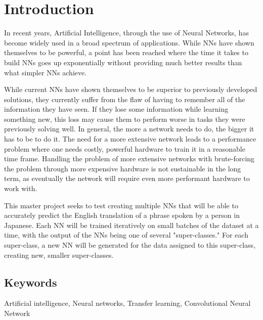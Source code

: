 \chapter{Introduction}






In recent years, Artificial Intelligence, through the use of Neural Networks, has become widely used in a broad spectrum of applications. 
While NNs have shown themselves to be powerful, a point has been reached where the time it takes to build NNs goes up exponentially without providing much better results than what simpler NNs achieve.

While current NNs have shown themselves to be superior to previously developed solutions, they currently suffer from the flaw of having to remember all of the information they have seen. 
If they lose some information while learning something new, this loss may cause them to perform worse in tasks they were previously solving well. In general, the more a network needs to do, the bigger it has to be to do it. 
The need for a more extensive network leads to a performance problem where one needs costly, powerful hardware to train it in a reasonable time frame. 
Handling the problem of more extensive networks with brute-forcing the problem through more expensive hardware is not sustainable in the long term, as eventually the network will require even more performant hardware to work with.

This master project seeks to test creating multiple NNs that will be able to accurately predict the English translation of a phrase spoken by a person in Japanese. 
Each NN will be trained iteratively on small batches of the dataset at a time, with the output of the NNs being one of several "super-classes." 
For each super-class, a new NN will be generated for the data assigned to this super-class, creating new, smaller super-classes.

\section{Keywords}
Artificial intelligence, Neural networks, Transfer learning, Convolutional Neural Network

